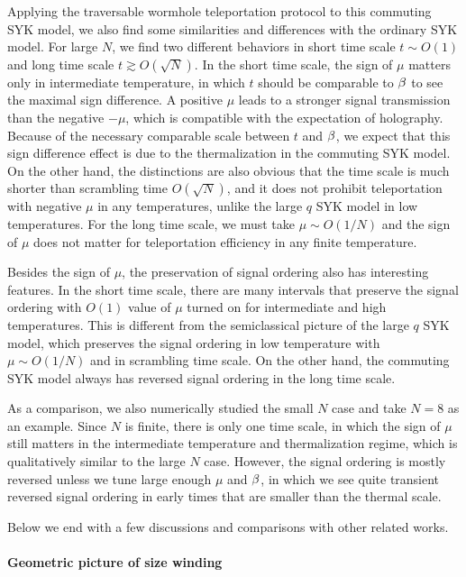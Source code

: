 \documentclass[11pt]{article}
\renewcommand{\>}{\rangle}
\newcommand{\<}{\langle}
\begin{document}
Applying the traversable wormhole teleportation protocol to this commuting
SYK model, we also find some similarities and differences with the
ordinary SYK model. For large $N$, we find two different behaviors
in short time scale $t\sim O(1)$ and long time scale $t\gtrsim O(\sqrt{N})$.
In the short time scale, the sign of $\mu$ matters only in intermediate
temperature, in which $t$ should be comparable to $\beta$ to see the
maximal sign difference. A positive $\mu$ leads to a stronger signal
transmission than the negative $-\mu$, which is compatible with
the expectation of holography. Because of the necessary comparable
scale between $t$ and $\beta$, we expect that this sign difference
effect is due to the thermalization in the commuting SYK model. On
the other hand, the distinctions are also obvious that the time scale
is much shorter than scrambling time $O(\sqrt{N})$, and it does not
prohibit teleportation with negative $\mu$ in any temperatures, unlike
the large $q$ SYK model in low temperatures. For the long time scale,
we must take $\mu\sim O(1/N)$ and the sign of $\mu$ does not matter
for teleportation efficiency in any finite temperature.

Besides the sign of $\mu$, the preservation of signal ordering also
has interesting features. In the short time scale, there are many
intervals that preserve the signal ordering with $O(1)$ value of
$\mu$ turned on for intermediate and high temperatures. This is different
from the semiclassical picture of the large $q$ SYK model, which preserves
the signal ordering in low temperature with $\mu\sim O(1/N)$ and
in scrambling time scale. On the other hand, the commuting SYK model
always has reversed signal ordering in the long time scale. 

As a comparison, we also numerically studied the small $N$ case and
take $N=8$ as an example. Since $N$ is finite, there is only one time scale, in which the sign of $\mu$ still matters in the intermediate
temperature and thermalization regime, which is qualitatively similar
to the large $N$ case. However, the signal ordering is mostly reversed
unless we tune large enough $\mu$ and $\beta$, in which we see quite
transient reversed signal ordering in early times that are smaller than the thermal scale.

Below we end with a few discussions and comparisons with other related
works.

\paragraph{Geometric picture of size winding }
\end{document}
